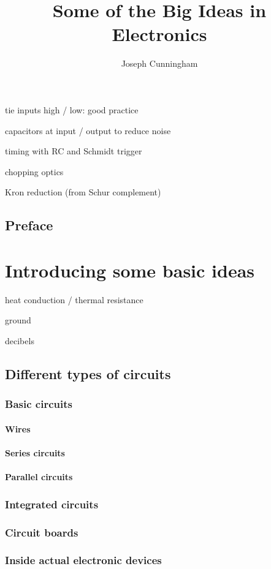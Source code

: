 \documentclass{report}
\title{Some of the Big Ideas in Electronics}
\author{Joseph Cunningham}
\date{}
\begin{document}
\maketitle
\tableofcontents

tie inputs high / low: good practice

capacitors at input / output to reduce noise

timing with RC and Schmidt trigger

chopping optics

Kron reduction (from Schur complement)

\chapter{Preface}

\part{Introducing some basic ideas}
heat conduction / thermal resistance

ground

decibels


\chapter{Different types of circuits}
\section{Basic circuits}
\subsection{Wires}
\subsection{Series circuits}
\subsection{Parallel circuits}
\section{Integrated circuits}
\section{Circuit boards}
\section{Inside actual electronic devices}
\end{document}
